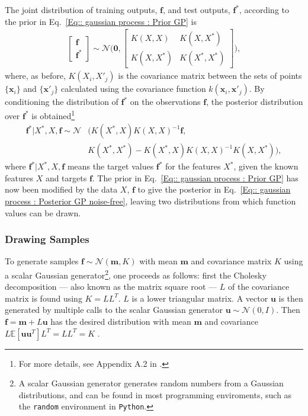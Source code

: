 \documentclass[twoside,english]{uiofysmaster}
\begin{document}
The joint distribution of training outputs, $\textbf{f}$, and test outputs, $\textbf{f}^*$, according to the prior in Eq.~\ref{Eq:: gaussian process : Prior GP} is
\begin{align}
\begin{bmatrix}
\textbf{f}\\
\textbf{f}^*
\end{bmatrix}
\sim 
\mathcal{N} \Bigg(
\boldsymbol{0},
\begin{bmatrix}
K(X, X) & K(X, X^*)\\
K(X, X^*) & K(X^*, X^*)
\end{bmatrix}
 \Bigg),
\end{align}
where, as before, $K(X_i, X'_j)$ is the covariance matrix between the sets of points $\{ \textbf{x}_i \}$ and $\{\textbf{x}'_j \}$ calculated using the covariance function $k(\textbf{x}_i, \textbf{x}'_j)$. By conditioning the distribution of $\textbf{f}^*$ on the observations $\textbf{f}$,  the posterior distribution over $\textbf{f}^*$ is obtained\footnote{For more details, see Appendix A.2 in \cite{rasmussen2006gaussian}.}  \cite{rasmussen2006gaussian} 
\begin{align}\label{Eq:: gaussian process : Posterior GP noise-free}
\textbf{f}^* \big| X^*, X, \textbf{f} \sim \mathcal{N}&(K(X^*, X)K(X, X)^{-1} \textbf{f},\\ &K(X^*, X^*) - K(X^*, X)K(X, X)^{-1}K(X, X^*)),
\end{align}
where $\textbf{f}^* | X^*, X, \textbf{f}$ means the target values $\textbf{f}^*$ for the features $X^*$, given the known features $X$ and targets $\textbf{f}$. The prior in Eq.~\ref{Eq:: gaussian process : Prior GP} has now been modified by the data $X$, $\textbf{f}$ to give the posterior in Eq.~\ref{Eq:: gaussian process : Posterior GP noise-free}, leaving two distributions from which function values can be drawn.


\subsubsection{Drawing Samples}

To generate samples $\textbf{f} \sim \mathcal{N}(\textbf{m}, K)$ with mean $\textbf{m}$ and covariance matrix $K$ using a scalar Gaussian generator\footnote{A scalar Gaussian generator generates random numbers from a Gaussian distributions, and can be found in most programming enviroments, such as the \verb|random| environment in \verb|Python|.}, one proceeds as follows: first the Cholesky decomposition --- also known as the matrix square root ---  $L$ of the covariance matrix is found using $K = LL^T$. $L$ is a lower triangular matrix. A vector $\textbf{u}$ is then generated by multiple calls to the scalar Gaussian generator $\textbf{u} \sim \mathcal{N}(0, I)$. Then $\textbf{f} = \textbf{m} + L \textbf{u}$ has the desired distribution with mean $\textbf{m}$ and covariance $L \mathbb{E} [\textbf{u} \textbf{u}^T]L^T = LL^T = K$ \cite{rasmussen2006gaussian}.
\end{document}
